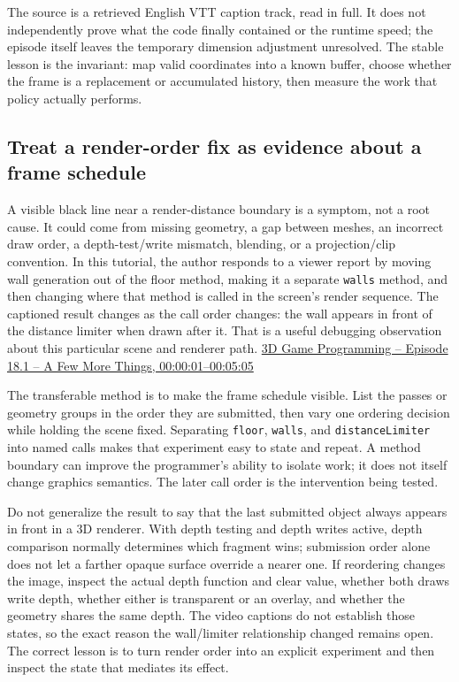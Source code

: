 The source is a retrieved English VTT caption track, read in full. It does not independently prove what the code finally contained or the runtime speed; the episode itself leaves the temporary dimension adjustment unresolved. The stable lesson is the invariant: map valid coordinates into a known buffer, choose whether the frame is a replacement or accumulated history, then measure the work that policy actually performs.

\subsection{Treat a render-order fix as evidence about a frame schedule}\label{03-visual-computing-i-ch004-treat-a-render-order-fix-as-evidence-about-a-frame-schedule}

\hypertarget{03-visual-computing-i-ch004-treat-a-render-order-fix-as-evidence-about-a-frame-schedule}{}

A visible black line near a render-distance boundary is a symptom, not a root cause. It could come from missing geometry, a gap between meshes, an incorrect draw order, a depth-test/write mismatch, blending, or a projection/clip convention. In this tutorial, the author responds to a viewer report by moving wall generation out of the floor method, making it a separate \texttt{walls} method, and then changing where that method is called in the screen's render sequence. The captioned result changes as the call order changes: the wall appears in front of the distance limiter when drawn after it. That is a useful debugging observation about this particular scene and renderer path. \href{https://www.youtube.com/watch?v=98K5Bm2sApY&t=1s}{3D Game Programming -- Episode 18.1 -- A Few More Things, 00:00:01--00:05:05}

The transferable method is to make the frame schedule visible. List the passes or geometry groups in the order they are submitted, then vary one ordering decision while holding the scene fixed. Separating \texttt{floor}, \texttt{walls}, and \texttt{distanceLimiter} into named calls makes that experiment easy to state and repeat. A method boundary can improve the programmer's ability to isolate work; it does not itself change graphics semantics. The later call order is the intervention being tested.

Do not generalize the result to say that the last submitted object always appears in front in a 3D renderer. With depth testing and depth writes active, depth comparison normally determines which fragment wins; submission order alone does not let a farther opaque surface override a nearer one. If reordering changes the image, inspect the actual depth function and clear value, whether both draws write depth, whether either is transparent or an overlay, and whether the geometry shares the same depth. The video captions do not establish those states, so the exact reason the wall/limiter relationship changed remains open. The correct lesson is to turn render order into an explicit experiment and then inspect the state that mediates its effect.

